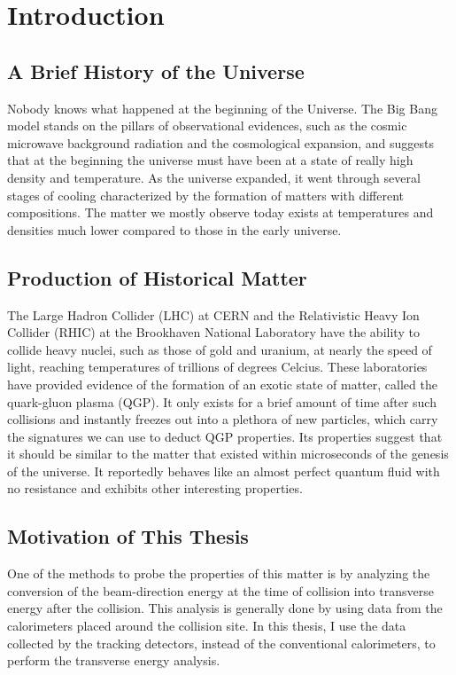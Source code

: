 \chapter{Introduction} \label{ch:introduction}

\section{A Brief History of the Universe}
Nobody knows what happened at the beginning of the Universe. The Big Bang model stands on the pillars of observational evidences, such as the cosmic microwave background radiation and the cosmological expansion, and suggests that at the beginning the universe must have been at a state of really high density and temperature. As the universe expanded, it went through several stages of cooling characterized by the formation of matters with different compositions. The matter we mostly observe today exists at temperatures and densities much lower compared to those in the early universe.

\section{Production of Historical Matter}
The Large Hadron Collider (LHC) at CERN and the Relativistic Heavy Ion Collider (RHIC) at the Brookhaven National Laboratory have the ability to collide heavy nuclei, such as those of gold and uranium, at nearly the speed of light, reaching temperatures of trillions of degrees Celcius. These laboratories have provided evidence of the formation of an exotic state of matter, called the quark-gluon plasma (QGP). It only exists for a brief amount of time after such collisions and instantly freezes out into a plethora of new particles, which carry the signatures we can use to deduct QGP properties. Its properties suggest that it should be similar to the matter that existed within microseconds of the genesis of the universe. It reportedly behaves like an almost perfect quantum fluid with no resistance and exhibits other interesting properties.

\section{Motivation of This Thesis}
One of the methods to probe the properties of this matter is by analyzing the conversion of the beam-direction energy at the time of collision into transverse energy after the collision. This analysis is generally done by using data from the calorimeters placed around the collision site. In this thesis, I use the data collected by the tracking detectors, instead of the conventional calorimeters, to perform the transverse energy analysis.

